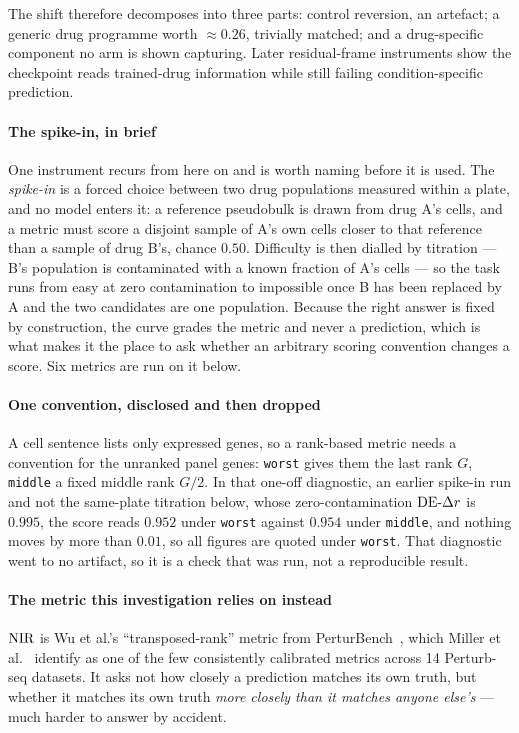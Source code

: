 The shift therefore decomposes into three parts: control reversion, an
artefact; a generic drug programme worth $\approx 0.26$, trivially matched; and
a drug-specific component no arm is shown capturing. Later residual-frame
instruments show the checkpoint reads trained-drug information while still
failing condition-specific prediction.

\paragraph{The spike-in, in brief} One instrument recurs from here on and is
worth naming before it is used. The \emph{spike-in} is a forced choice between
two drug populations measured within a plate, and no model enters it: a
reference pseudobulk is drawn from drug A's cells, and a metric must score a
disjoint sample of A's own cells closer to that reference than a sample of drug
B's, chance $0.50$. Difficulty is then dialled by titration --- B's population is
contaminated with a known fraction of A's cells --- so the task runs from easy at
zero contamination to impossible once B has been replaced by A and the two
candidates are one population. Because the right answer is fixed by
construction, the curve grades the metric and never a prediction, which is what
makes it the place to ask whether an arbitrary scoring convention changes a
score. Six metrics are run on it below.

\paragraph{One convention, disclosed and then dropped} A cell sentence lists
only expressed genes, so a rank-based metric needs a convention for the unranked
panel genes: \texttt{worst} gives them the last rank $G$, \texttt{middle} a
fixed middle rank $G/2$. In that one-off diagnostic, an earlier spike-in run and not the same-plate titration below, whose zero-contamination $\textrm{DE-}\Delta r$ is $0.995$, the score reads $0.952$ under \texttt{worst} against $0.954$ under \texttt{middle}, and nothing moves by more than $0.01$, so all figures are quoted under \texttt{worst}. That diagnostic went to no artifact, so it is a check that was
run, not a reproducible result.

\paragraph{The metric this investigation relies on instead} $\textrm{NIR}$ is Wu
et al.'s ``transposed-rank'' metric from PerturBench~\cite{perturbench}, which
Miller et al.~\cite{miller} identify as one of the few consistently calibrated
metrics across 14 Perturb-seq datasets. It asks not how closely a prediction
matches its own truth, but whether it matches its own truth \emph{more closely
than it matches anyone else's} --- much harder to answer by accident.

